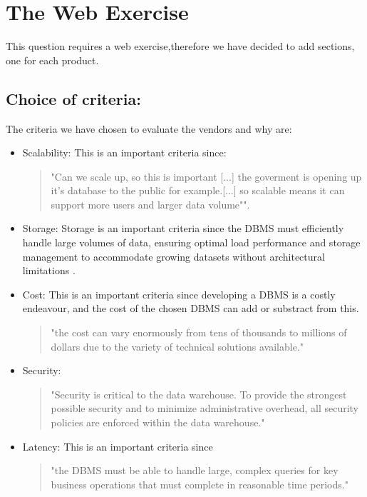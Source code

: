\section{The Web Exercise}
This question requires a web exercise,therefore we have decided to add sections, one for each product. 

\subsection{Choice of criteria:}
The criteria we have chosen to evaluate the vendors and why are:
\begin{itemize}
    \item Scalability: This is an important criteria since:
    \begin{quotation}
        "Can we scale up, so this is important [...] the goverment is opening up it's database to the public for example.[...] so scalable means it can support more users and larger data volume"\cite{l1video}".
    \end{quotation}
    \item Storage: Storage is an important criteria since
    the DBMS must efficiently handle large volumes of data, 
    ensuring optimal load performance and storage management to 
    accommodate growing datasets without architectural limitations \cite[p. 1239]{CourseLitt}.
    \item Cost: This is an important criteria since developing a DBMS is a costly endeavour, and the cost of the chosen DBMS can add or substract from this. \begin{quotation}
        "the cost can vary enormously from tens of thousands to millions of dollars due to
    the variety of technical solutions available." \cite[p. 1226]{CourseLitt}
    \end{quotation}
    \item Security: \begin{quote}
        "Security is critical to the data warehouse. To provide the strongest possible
security and to minimize administrative overhead, all security policies are enforced
within the data warehouse."\cite[p. 1309]{CourseLitt}
    \end{quote}
    \item Latency: This is an important criteria since \begin{quotation}
         "the DBMS must be able to handle large, complex queries for key business operations that must complete in reasonable time periods." \cite[p. 1239]{CourseLitt}
    \end{quotation} 
\end{itemize}

